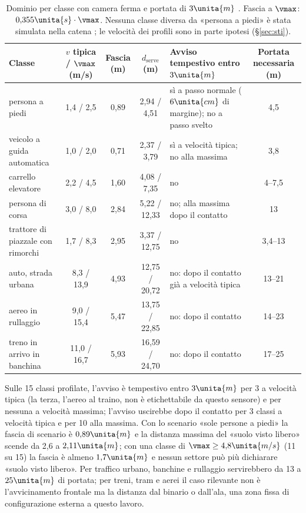 \begin{table}[H]\centering\footnotesize
\caption{Dominio per classe con camera ferma e portata di $3\unita{m}$ . Fascia a $\vmax$: $0{,}355\unita{s}\cdot\vmax$. Nessuna classe diversa da «persona a piedi» è stata simulata nella catena ; le velocità dei profili sono in parte ipotesi (\S\ref{sec:sti}).}\label{tab:occ-classi}
\begin{tabularx}{\linewidth}{>{\RaggedRight\arraybackslash}p{3.4cm} c c c L c}
\toprule
Classe & $v$ tipica / $\vmax$ (m/s) & Fascia (m) & $d_{\mathrm{serve}}$ (m) & Avviso tempestivo entro $3\unita{m}$ & Portata necessaria (m)\\
\midrule
persona a piedi & 1,4 / 2,5 & 0,89 & 2,94 / 4,51 & sì a passo normale ($6\unita{cm}$ di margine); no a passo svelto & 4,5\\
veicolo a guida automatica & 1,0 / 2,0 & 0,71 & 2,37 / 3,79 & sì a velocità tipica; no alla massima & 3,8\\
carrello elevatore & 2,2 / 4,5 & 1,60 & 4,08 / 7,35 & no & 4--7,5\\
persona di corsa & 3,0 / 8,0 & 2,84 & 5,22 / 12,33 & no; alla massima dopo il contatto & 13\\
trattore di piazzale con rimorchi & 1,7 / 8,3 & 2,95 & 3,37 / 12,75 & no & 3,4--13\\
auto, strada urbana & 8,3 / 13,9 & 4,93 & 12,75 / 20,72 & no: dopo il contatto già a velocità tipica & 13--21\\
aereo in rullaggio & 9,0 / 15,4 & 5,47 & 13,75 / 22,85 & no: dopo il contatto & 14--23\\
treno in arrivo in banchina & 11,0 / 16,7 & 5,93 & 16,59 / 24,70 & no: dopo il contatto & 17--25\\
\bottomrule
\end{tabularx}
\end{table}

Sulle 15 classi profilate, l'avviso è tempestivo entro $3\unita{m}$ per 3 a velocità tipica (la terza, l'aereo al traino, non è etichettabile da questo sensore) e per nessuna a velocità massima; l'avviso uscirebbe dopo il contatto per 3 classi a velocità tipica e per 10 alla massima. Con lo scenario «sole persone a piedi» la fascia di scenario è $0{,}89\unita{m}$ e la distanza massima del «suolo visto libero» scende da 2,6 a $2{,}11\unita{m}$; con una classe di $\vmax\ge4{,}8\unita{m/s}$ (11 su 15) la fascia è almeno $1{,}7\unita{m}$ e nessun settore può più dichiarare «suolo visto libero». Per traffico urbano, banchine e rullaggio servirebbero da 13 a $25\unita{m}$ di portata; per treni, tram e aerei il caso rilevante non è l'avvicinamento frontale ma la distanza dal binario o dall'ala, una zona fissa di configurazione esterna a questo lavoro.

